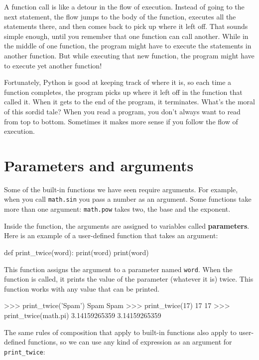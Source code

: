 A function call is like a detour in the flow of execution. Instead of
going to the next statement, the flow jumps to the body of
the function, executes all the statements there, and then comes back
to pick up where it left off.
That sounds simple enough, until you remember that one function can
call another.  While in the middle of one function, the program might
have to execute the statements in another function. But while
executing that new function, the program might have to execute yet
another function!

Fortunately, Python is good at keeping track of where it is, so each
time a function completes, the program picks up where it left off in
the function that called it.  When it gets to the end of the program,
it terminates.
What's the moral of this sordid tale?  When you read a program, you
don't always want to read from top to bottom.  Sometimes it makes
more sense if you follow the flow of execution.


\section{Parameters and arguments}
\label{parameters}

Some of the built-in functions we have seen require arguments.  For
example, when you call {\tt math.sin} you pass a number
as an argument.  Some functions take more than one argument:
{\tt math.pow} takes two, the base and the exponent.

Inside the function, the arguments are assigned to
variables called {\bf parameters}.  Here is an example of a
user-defined function that takes an argument:


\beforeverb
\begin{pycode}
def print_twice(word):
    print(word)
    print(word)
\end{pycode}
\afterverb
%
This function assigns the argument to a parameter
named {\tt word}.  When the function is called, it prints the value of
the parameter (whatever it is) twice.
This function works with any value that can be printed.

\beforeverb
\begin{pyinterpreter}
>>> print_twice('Spam')
Spam
Spam
>>> print_twice(17)
17
17
>>> print_twice(math.pi)
3.14159265359
3.14159265359
\end{pyinterpreter}
\afterverb
%
The same rules of composition that apply to built-in functions also
apply to user-defined functions, so we can use any kind of expression
as an argument for \verb"print_twice":

